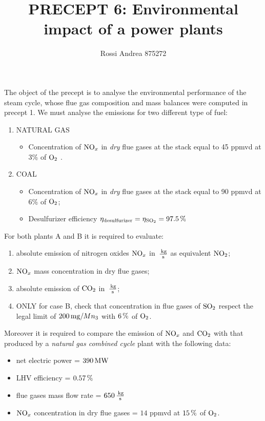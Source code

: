 \documentclass[a4paper,12pt]{article}
\title{PRECEPT 6: Environmental impact of a power plants}
\author{Rossi Andrea 875272}
\date{}
\begin{document}
\maketitle

The	object of the precept is to	analyse	the	environmental performance of the steam cycle, whose flue gas composition and mass balances were computed in precept 1.
We must analyse the emissions for two different type of fuel:
\begin{enumerate}[label=\Alph*)]
\item NATURAL GAS
	\begin{itemize}
	\item Concentration of $\text{NO}_x$ in \emph{dry} flue gases at the stack equal to 45 ppmvd at 3\% of $\text{O}_2$ .
	\end{itemize}
\item COAL
	\begin{itemize}
	\item Concentration of $\text{NO}_x$ in \emph{dry} flue gases at the stack equal to 90 ppmvd at 6\% of $\text{O}_2$;
	\item Desulfurizer efficiency $\eta_{\text{desulfurizer}} = \eta_{\text{SO}_2}= 97.5\,\%$
	\end{itemize}
\end{enumerate}
%
For both plants A and B it is required to evaluate:
\begin{enumerate}
\item absolute emission of nitrogen oxides $\text{NO}_x$ in $\,\frac{\,\text{kg}}{\text{s}}$ as equivalent $\text{NO}_2$;
\item $\text{NO}_x$ mass concentration in dry flue gases;
\item absolute emission of $\text{CO}_2$ in $\,\frac{\,\text{kg}}{\text{s}}$;
\item ONLY for case B, check that concentration in flue gases of $\text{SO}_2$ respect the legal limit of $200\,\text{mg}/Mn_3$ with $6\,\%$ of $\text{O}_2$.
\end{enumerate}
Moreover it is required to compare the emission of $\text{NO}_x$ and $\text{CO}_2$ with that produced by a \emph{natural gas combined cycle} plant with the following data:
\begin{itemize}
\item net electric power = $390\,\text{MW}$
\item LHV efficiency = $0.57\,\%$
\item flue gases mass flow rate = $650\,\frac{\,\text{kg}}{\text{s}}$
\item $\text{NO}_x$ concentration in dry flue gases = $14$ ppmvd at $15\,\%$ of $\text{O}_2$.
\end{itemize}
\end{document}
